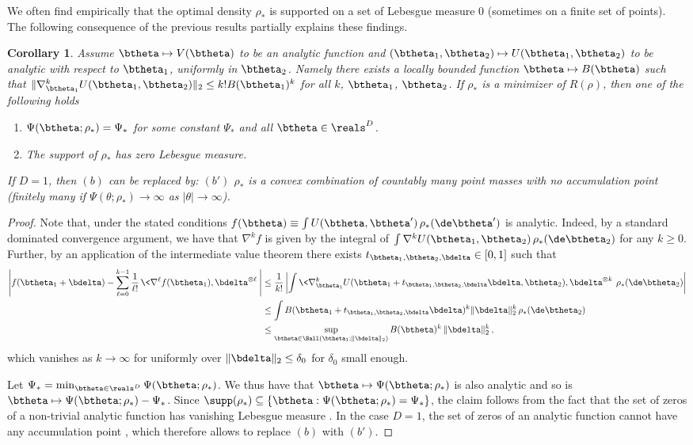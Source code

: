 \documentclass[11pt]{article}
\newtheorem{corollary}{Corollary}
\begin{document}
We often find empirically that the optimal density $\rho_*$ is supported on a set of Lebesgue measure $0$
(sometimes on a finite set of points). The following consequence of the previous results partially explains these findings.
%
\begin{corollary}
Assume $\btheta\mapsto V(\btheta)$ to be an analytic function and $(\btheta_1,\btheta_2)\mapsto U(\btheta_1,\btheta_2)$ to be analytic with respect to $\btheta_1$,
 uniformly in $\btheta_2$. Namely there exists a locally bounded function $\btheta\mapsto B(\btheta)$ such that $\|\nabla^{k}_{\btheta_1}U(\btheta_1,\btheta_2)\|_2\le k! B(\btheta_1)^k$
for all $k$, $\btheta_1$, $\btheta_2$. If $\rho_*$ is a minimizer of $R(\rho)$, 
then one of the following holds
%
\begin{enumerate}
%
\item[$(a)$] $\Psi(\btheta;\rho_*)=\Psi_*$ for some constant $\Psi_*$ and all $\btheta\in\reals^D$. 
%
\item[$(b)$] The support of $\rho_*$ has zero Lebesgue measure.
%
\end{enumerate}
%
If $D=1$, then $(b)$ can be replaced by: $(b')$ $\rho_*$ is a convex combination of countably many point masses with no accumulation point
(finitely many if $\Psi(\theta;\rho_*)\to\infty$ as $|\theta|\to\infty$).
\end{corollary}
%
\begin{proof}
Note that, under the stated conditions $f(\btheta) \equiv \int U(\btheta,\btheta') \, \rho_*(\de\btheta')$ is analytic. 
Indeed, by a standard dominated convergence argument, we have that $\nabla^kf$ is given by the integral of $\int \nabla^k U(\btheta_1,\btheta_2)\, \rho_*(\de\btheta_2)$ for any $k\ge 0$.
Further, by an application of the intermediate value theorem there exists $t_{\btheta_1,\btheta_2,\bdelta} \in [0, 1]$ such that
%
\begin{align}
%
\left|f(\btheta_1+\bdelta) - \sum_{\ell=0}^{k-1}\frac{1}{\ell !}\, \<\nabla^{\ell}f(\btheta_1),\bdelta^{\otimes \ell}\>\right|& \le 
\frac{1}{k!}\left|\int \<\nabla_{\btheta_1}^{k}U(\btheta_1 +t_{\btheta_1,\btheta_2,\bdelta}\bdelta, \btheta_2),\bdelta^{\otimes k}\> \, \rho_*(\de\btheta_2)\right|\\
& \le \int B(\btheta_1 +t_{\btheta_1,\btheta_2,\bdelta}\bdelta)^k\|\bdelta\|_2^k \, \rho_*(\de\btheta_2)\\
& \le \sup_{\btheta\in\Ball(\btheta_1; \| \bdelta\|_2)} B(\btheta)^k \, \|\bdelta\|_2^k \, ,
%
\end{align}
%
which vanishes as $k\to\infty$ for uniformly over $\|\bdelta\|_2\le \delta_0$ for $\delta_0$ small enough. 

Let $\Psi_* = \min_{\btheta\in\reals^D}\Psi(\btheta;\rho_*)$. We thus have that $\btheta\mapsto \Psi(\btheta;\rho_*)$ is also analytic and
so is $\btheta\mapsto \Psi(\btheta;\rho_*)-\Psi_*$.
Since $\supp(\rho_*)\subseteq\{\btheta: \Psi(\btheta;\rho_*) = \Psi_*\}$, the claim follows from the fact that the set of zeros of a non-trivial analytic function has
vanishing Lebesgue measure \cite{mityagin2015zero}. In the case $D=1$, the set of zeros of an analytic function cannot have any accumulation point \cite{lang2013complex},
which therefore allows to replace $(b)$ with $(b')$.
\end{proof}
\end{document}
